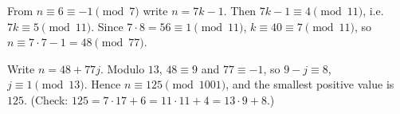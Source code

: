 From $n\equiv6\equiv-1\pmod7$ write $n=7k-1$. Then $7k-1\equiv4\pmod{11}$, i.e. $7k\equiv5\pmod{11}$. Since $7\cdot8=56\equiv1\pmod{11}$, $k\equiv40\equiv7\pmod{11}$, so $n\equiv7\cdot7-1=48\pmod{77}$.

Write $n=48+77j$. Modulo $13$, $48\equiv9$ and $77\equiv-1$, so $9-j\equiv8$, $j\equiv1\pmod{13}$. Hence $n\equiv125\pmod{1001}$, and the smallest positive value is $\boxed{125}$. (Check: $125=7\cdot17+6=11\cdot11+4=13\cdot9+8$.)
